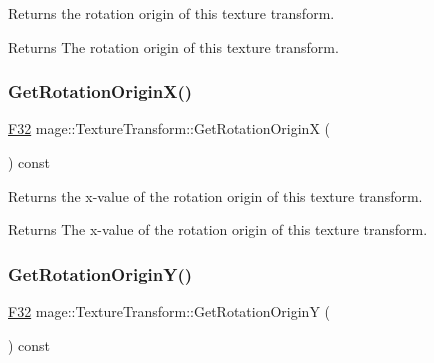 Returns the rotation origin of this texture transform.

\begin{DoxyReturn}{Returns}
The rotation origin of this texture transform. 
\end{DoxyReturn}
\mbox{\label{classmage_1_1_texture_transform_a8cf3f245042d98a135b5d12ae590b2b2}} 
\subsubsection{\texorpdfstring{Get\+Rotation\+Origin\+X()}{GetRotationOriginX()}}
{\footnotesize\ttfamily \mbox{\hyperlink{namespacemage_aa97e833b45f06d60a0a9c4fc22ae02c0}{F32}} mage\+::\+Texture\+Transform\+::\+Get\+Rotation\+OriginX (\begin{DoxyParamCaption}{ }\end{DoxyParamCaption}) const\hspace{0.3cm}{\ttfamily [noexcept]}}

Returns the x-\/value of the rotation origin of this texture transform.

\begin{DoxyReturn}{Returns}
The x-\/value of the rotation origin of this texture transform. 
\end{DoxyReturn}
\mbox{\label{classmage_1_1_texture_transform_a2efe9088ae3532b188bab7c5b27238e6}} 
\subsubsection{\texorpdfstring{Get\+Rotation\+Origin\+Y()}{GetRotationOriginY()}}
{\footnotesize\ttfamily \mbox{\hyperlink{namespacemage_aa97e833b45f06d60a0a9c4fc22ae02c0}{F32}} mage\+::\+Texture\+Transform\+::\+Get\+Rotation\+OriginY (\begin{DoxyParamCaption}{ }\end{DoxyParamCaption}) const\hspace{0.3cm}{\ttfamily [noexcept]}}

